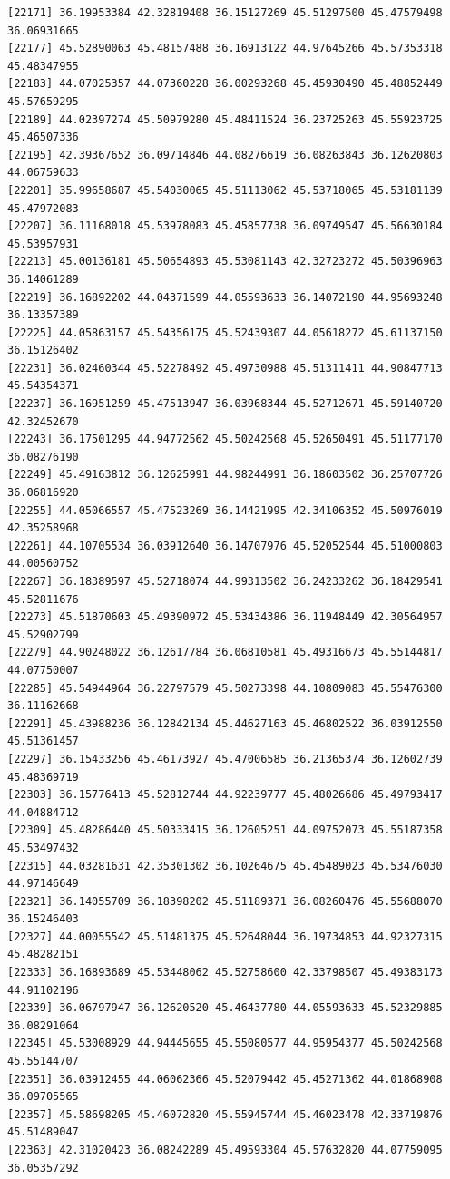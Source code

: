 \documentclass[
  letterpaper,
  DIV=11,
  numbers=noendperiod]{scrartcl}
\begin{document}
\begin{verbatim}
[22171] 36.19953384 42.32819408 36.15127269 45.51297500 45.47579498 36.06931665
[22177] 45.52890063 45.48157488 36.16913122 44.97645266 45.57353318 45.48347955
[22183] 44.07025357 44.07360228 36.00293268 45.45930490 45.48852449 45.57659295
[22189] 44.02397274 45.50979280 45.48411524 36.23725263 45.55923725 45.46507336
[22195] 42.39367652 36.09714846 44.08276619 36.08263843 36.12620803 44.06759633
[22201] 35.99658687 45.54030065 45.51113062 45.53718065 45.53181139 45.47972083
[22207] 36.11168018 45.53978083 45.45857738 36.09749547 45.56630184 45.53957931
[22213] 45.00136181 45.50654893 45.53081143 42.32723272 45.50396963 36.14061289
[22219] 36.16892202 44.04371599 44.05593633 36.14072190 44.95693248 36.13357389
[22225] 44.05863157 45.54356175 45.52439307 44.05618272 45.61137150 36.15126402
[22231] 36.02460344 45.52278492 45.49730988 45.51311411 44.90847713 45.54354371
[22237] 36.16951259 45.47513947 36.03968344 45.52712671 45.59140720 42.32452670
[22243] 36.17501295 44.94772562 45.50242568 45.52650491 45.51177170 36.08276190
[22249] 45.49163812 36.12625991 44.98244991 36.18603502 36.25707726 36.06816920
[22255] 44.05066557 45.47523269 36.14421995 42.34106352 45.50976019 42.35258968
[22261] 44.10705534 36.03912640 36.14707976 45.52052544 45.51000803 44.00560752
[22267] 36.18389597 45.52718074 44.99313502 36.24233262 36.18429541 45.52811676
[22273] 45.51870603 45.49390972 45.53434386 36.11948449 42.30564957 45.52902799
[22279] 44.90248022 36.12617784 36.06810581 45.49316673 45.55144817 44.07750007
[22285] 45.54944964 36.22797579 45.50273398 44.10809083 45.55476300 36.11162668
[22291] 45.43988236 36.12842134 45.44627163 45.46802522 36.03912550 45.51361457
[22297] 36.15433256 45.46173927 45.47006585 36.21365374 36.12602739 45.48369719
[22303] 36.15776413 45.52812744 44.92239777 45.48026686 45.49793417 44.04884712
[22309] 45.48286440 45.50333415 36.12605251 44.09752073 45.55187358 45.53497432
[22315] 44.03281631 42.35301302 36.10264675 45.45489023 45.53476030 44.97146649
[22321] 36.14055709 36.18398202 45.51189371 36.08260476 45.55688070 36.15246403
[22327] 44.00055542 45.51481375 45.52648044 36.19734853 44.92327315 45.48282151
[22333] 36.16893689 45.53448062 45.52758600 42.33798507 45.49383173 44.91102196
[22339] 36.06797947 36.12620520 45.46437780 44.05593633 45.52329885 36.08291064
[22345] 45.53008929 44.94445655 45.55080577 44.95954377 45.50242568 45.55144707
[22351] 36.03912455 44.06062366 45.52079442 45.45271362 44.01868908 36.09705565
[22357] 45.58698205 45.46072820 45.55945744 45.46023478 42.33719876 45.51489047
[22363] 42.31020423 36.08242289 45.49593304 45.57632820 44.07759095 36.05357292

\end{verbatim}
\end{document}
